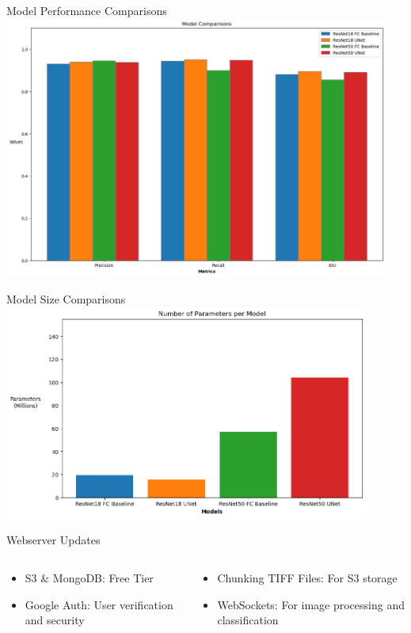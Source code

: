 \begin{frame}{Model Performance Comparisons}
    \centering
    \includegraphics[height=0.9\textheight,width=0.95\textwidth,keepaspectratio]{images/mm_performance.png}
\end{frame}

\begin{frame}{Model Size Comparisons}
    \centering
    \includegraphics[height=0.9\textheight,width=0.9\textwidth,keepaspectratio]{images/mm_params.png}
\end{frame}

\begin{frame}{Webserver Updates}
    \begin{columns}
        \begin{column}{0.5\textwidth}
            \begin{itemize}
                \item S3 & MongoDB: Free Tier
                \item Google Auth: User verification and security
            \end{itemize}    
        \end{column}
        \begin{column}{0.5\textwidth}
            \begin{itemize}
                \item Chunking TIFF Files: For S3 storage
                \item WebSockets: For image processing and classification
            \end{itemize}    
        \end{column}
    \end{columns}
\end{frame}

